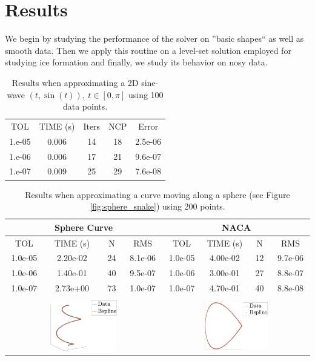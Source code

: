 \documentclass[a4paper,10pt]{article}
\begin{document}
   
\section{Results}
We begin by studying the performance of the solver on ''basic shapes`` as well as smooth data. 
Then we apply this routine on a level-set solution employed for studying ice formation and finally, we study 
 its behavior on nosy data. 
 
 \begin{table}
 \centering
  \begin{tabular}{|c| c| c|c |c|}
  \hline
 TOL&TIME (s)&Iters& NCP  & Error      \\ 
1.e-05&	0.006&	14&	18&	2.5e-06\\
1.e-06&	0.006&	17&	21&	9.6e-07\\
1.e-07&	0.009&	25&	29&	7.6e-08\\
\hline
   \end{tabular}
\caption{Results when approximating a 2D sine-wave $(t,\sin(t)), \ t\in[0,\pi]$ using 100 data points.}
 \end{table}

 \begin{table}
 \centering
  \begin{tabular}{||c c c c||c c c c||}
  \hline
  \multicolumn{4}{||c||}{\textbf{Sphere Curve}} & \multicolumn{4}{c||}{\textbf{NACA}}\\
  \hline
 TOL    & TIME (s) & N  & RMS     & TOL    & TIME (s) & N  & RMS     \\
 \hline
1.0e-05 & 2.20e-02 & 24	& 8.1e-06 & 1.0e-05 & 4.00e-02 & 12 & 9.7e-06\\
1.0e-06 & 1.40e-01 & 40	& 9.5e-07 & 1.0e-06 & 3.00e-01 & 27 & 8.8e-07\\
1.0e-07 & 2.73e+00 & 73	& 1.0e-07 & 1.0e-07 & 4.70e-01 & 40 & 8.8e-08\\
\multicolumn{8}{||c||}{}\\
\multicolumn{4}{||c||}{\includegraphics[width=0.45\textwidth]{snake-crop}}&
\multicolumn{4}{c||}{\includegraphics[width=0.45\textwidth]{naca27-crop} }\\
\hline
\end{tabular}
\caption{Results when approximating a curve moving along a sphere (see Figure \ref{fig:sphere_snake}) using 200 points.}
 \end{table}
\end{document}
